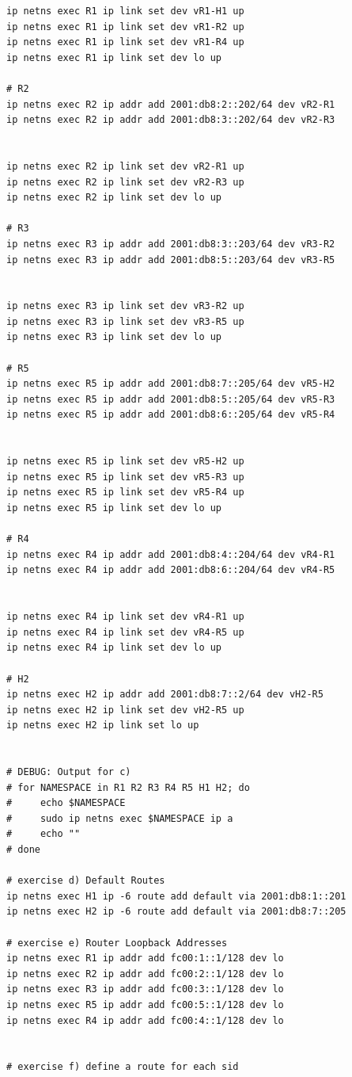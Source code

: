 \documentclass{article}
\begin{document}
\begin{verbatim}
ip netns exec R1 ip link set dev vR1-H1 up
ip netns exec R1 ip link set dev vR1-R2 up
ip netns exec R1 ip link set dev vR1-R4 up
ip netns exec R1 ip link set dev lo up

# R2
ip netns exec R2 ip addr add 2001:db8:2::202/64 dev vR2-R1
ip netns exec R2 ip addr add 2001:db8:3::202/64 dev vR2-R3


ip netns exec R2 ip link set dev vR2-R1 up
ip netns exec R2 ip link set dev vR2-R3 up
ip netns exec R2 ip link set dev lo up

# R3
ip netns exec R3 ip addr add 2001:db8:3::203/64 dev vR3-R2
ip netns exec R3 ip addr add 2001:db8:5::203/64 dev vR3-R5


ip netns exec R3 ip link set dev vR3-R2 up
ip netns exec R3 ip link set dev vR3-R5 up
ip netns exec R3 ip link set dev lo up

# R5
ip netns exec R5 ip addr add 2001:db8:7::205/64 dev vR5-H2
ip netns exec R5 ip addr add 2001:db8:5::205/64 dev vR5-R3
ip netns exec R5 ip addr add 2001:db8:6::205/64 dev vR5-R4


ip netns exec R5 ip link set dev vR5-H2 up
ip netns exec R5 ip link set dev vR5-R3 up
ip netns exec R5 ip link set dev vR5-R4 up
ip netns exec R5 ip link set dev lo up

# R4
ip netns exec R4 ip addr add 2001:db8:4::204/64 dev vR4-R1
ip netns exec R4 ip addr add 2001:db8:6::204/64 dev vR4-R5


ip netns exec R4 ip link set dev vR4-R1 up
ip netns exec R4 ip link set dev vR4-R5 up
ip netns exec R4 ip link set dev lo up

# H2
ip netns exec H2 ip addr add 2001:db8:7::2/64 dev vH2-R5
ip netns exec H2 ip link set dev vH2-R5 up
ip netns exec H2 ip link set lo up


# DEBUG: Output for c)
# for NAMESPACE in R1 R2 R3 R4 R5 H1 H2; do
#     echo $NAMESPACE
#     sudo ip netns exec $NAMESPACE ip a
#     echo ""
# done

# exercise d) Default Routes
ip netns exec H1 ip -6 route add default via 2001:db8:1::201
ip netns exec H2 ip -6 route add default via 2001:db8:7::205

# exercise e) Router Loopback Addresses
ip netns exec R1 ip addr add fc00:1::1/128 dev lo
ip netns exec R2 ip addr add fc00:2::1/128 dev lo
ip netns exec R3 ip addr add fc00:3::1/128 dev lo
ip netns exec R5 ip addr add fc00:5::1/128 dev lo
ip netns exec R4 ip addr add fc00:4::1/128 dev lo


# exercise f) define a route for each sid


\end{verbatim}
\end{document}
